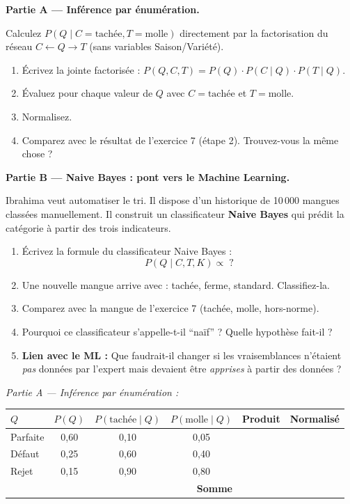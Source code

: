 \documentclass[11pt,a4paper]{article}
\begin{document}
\begin{exercicebox}[Énoncé]
\textbf{Partie A --- Inférence par énumération.}

Calculez $P(Q \mid C = \text{tachée}, T = \text{molle})$ directement par la factorisation du réseau $C \leftarrow Q \to T$ (sans variables Saison/Variété).

\begin{enumerate}
    \item Écrivez la jointe factorisée : $P(Q, C, T) = P(Q) \cdot P(C \mid Q) \cdot P(T \mid Q)$.
    \item Évaluez pour chaque valeur de $Q$ avec $C = \text{tachée}$ et $T = \text{molle}$.
    \item Normalisez.
    \item Comparez avec le résultat de l'exercice 7 (étape 2). Trouvez-vous la même chose ?
\end{enumerate}

\medskip

\textbf{Partie B --- Naive Bayes : pont vers le Machine Learning.}

Ibrahima veut automatiser le tri. Il dispose d'un historique de 10\,000 mangues classées manuellement. Il construit un classificateur \textbf{Naive Bayes} qui prédit la catégorie à partir des trois indicateurs.

\begin{enumerate}[resume]
    \item Écrivez la formule du classificateur Naive Bayes :
    $$P(Q \mid C, T, K) \propto \; ?$$
    \item Une nouvelle mangue arrive avec : tachée, ferme, standard. Classifiez-la.
    \item Comparez avec la mangue de l'exercice 7 (tachée, molle, hors-norme). 
    \item Pourquoi ce classificateur s'appelle-t-il ``naïf'' ? Quelle hypothèse fait-il ?
    \item \textbf{Lien avec le ML :} Que faudrait-il changer si les vraisemblances n'étaient \textit{pas} données par l'expert mais devaient être \textit{apprises} à partir des données ?
\end{enumerate}
\end{exercicebox}

\noindent\textit{Partie A --- Inférence par énumération :}

\begin{center}
\renewcommand{\arraystretch}{2.2}
\begin{tabular}{|l|c|c|c|c|c|}
\hline
$Q$ & $P(Q)$ & $P(\text{tachée} \mid Q)$ & $P(\text{molle} \mid Q)$ & \textbf{Produit} & \textbf{Normalisé} \\
\hline
Parfaite & 0,60 & 0,10 & 0,05 & \hspace{1.5cm} & \hspace{1.5cm} \\
\hline
Défaut & 0,25 & 0,60 & 0,40 & & \\
\hline
Rejet & 0,15 & 0,90 & 0,80 & & \\
\hline
\multicolumn{4}{|r|}{\textbf{Somme}} & & \\
\hline
\end{tabular}
\end{center}
\end{document}
